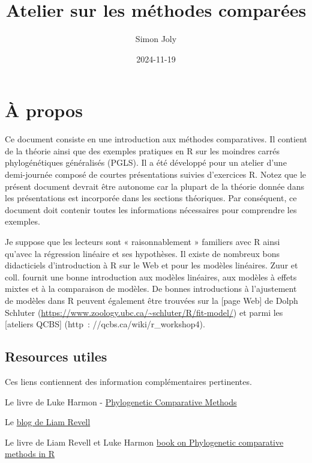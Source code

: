 \documentclass[
]{book}
\title{Atelier sur les méthodes comparées}
\author{Simon Joly}
\date{2024-11-19}
\begin{document}
\maketitle

{
\setcounter{tocdepth}{1}
\tableofcontents
}
\chapter{À propos}\label{uxe0-propos}

Ce document consiste en une introduction aux méthodes comparatives. Il contient de la théorie ainsi que des exemples pratiques en R sur les moindres carrés phylogénétiques généralisés (PGLS). Il a été développé pour un atelier d'une demi-journée composé de courtes présentations suivies d'exercices R. Notez que le présent document devrait être autonome car la plupart de la théorie donnée dans les présentations est incorporée dans les sections théoriques. Par conséquent, ce document doit contenir toutes les informations nécessaires pour comprendre les exemples.

Je suppose que les lecteurs sont « raisonnablement » familiers avec R ainsi qu'avec la régression linéaire et ses hypothèses. Il existe de nombreux bons didacticiels d'introduction à R sur le Web et pour les modèles linéaires. Zuur et coll. \citep{zuur2007analysing} fournit une bonne introduction aux modèles linéaires, aux modèles à effets mixtes et à la comparaison de modèles. De bonnes introductions à l'ajustement de modèles dans R peuvent également être trouvées sur la {[}page Web{]} de Dolph Schluter (\url{https://www.zoology.ubc.ca/~schluter/R/fit-model/}) et parmi les {[}ateliers QCBS{]} (http~: //qcbs.ca/wiki/r\_workshop4).

\section{Resources utiles}\label{resources-utiles}

Ces liens contiennent des information complémentaires pertinentes.

Le livre de Luke Harmon - \href{https://lukejharmon.github.io/pcm/}{Phylogenetic Comparative Methods}

Le \href{http://blog.phytools.org/}{blog de Liam Revell}

Le livre de Liam Revell et Luke Harmon \href{https://press.princeton.edu/books/ebook/9780691219042/phylogenetic-comparative-methods-in-r}{book on Phylogenetic comparative methods in R}
\end{document}
